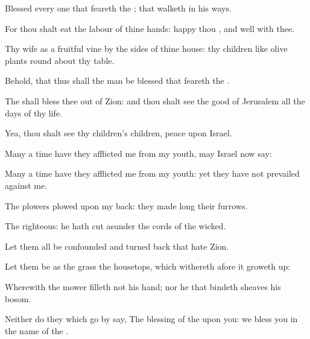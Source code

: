 {\Q {}Blessed
{} every one that
feareth the
{}; that
walketh in his
ways.


\par }{\Q {}For thou shalt
eat the
labour of thine
hands:
happy
{} thou
{}, and
{}
well with thee.


\par }{\Q {}Thy
wife
{} as a
fruitful
vine by the
sides of thine
house: thy
children like
olive
plants round
about thy
table.


\par }{\Q {}Behold, that thus shall the
man be
blessed that
feareth the
{}.


\par }{\Q {}The
{} shall
bless thee out of
Zion: and thou shalt
see the
good of
Jerusalem all the
days of thy
life.


\par }{\Q {}Yea, thou shalt
see thy
children’s
children,
{}
peace upon
Israel.




\par }
{\Q {}Many a
time have they
afflicted me from my
youth, may
Israel now
say:


\par }{\Q {}Many a
time have they
afflicted me from my
youth: yet they have not
prevailed against me.


\par }{\Q {}The
plowers
plowed upon my
back: they made
long their
furrows.


\par }{\Q {}The
{}
{}
righteous: he hath cut
asunder the
cords of the
wicked.


\par }{\BB \par }
{\Q {}Let them all be
confounded and
turned
back that
hate
Zion.


\par }{\Q {}Let them be as the
grass
{} the
housetops, which
withereth
afore it groweth
up:


\par }{\Q {}Wherewith the
mower
filleth not his
hand; nor he that bindeth
sheaves his
bosom.


\par }{\Q {}Neither do they which go
by
say, The
blessing of the
{}
{} upon you: we
bless you in the
name of the
{}.




\par }
